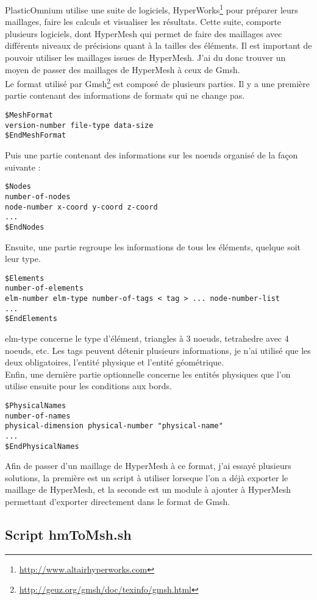 PlasticOmnium utilise une suite de logiciels, HyperWorks\footnote{\url{http://www.altairhyperworks.com}} pour préparer leurs maillages, faire les calculs et visualiser les résultats. Cette suite, comporte plusieurs logiciels, dont HyperMesh qui permet de faire des maillages avec différents niveaux de précisions quant à la tailles des éléments. Il est important de pouvoir utiliser les maillages issues de HyperMesh. J'ai du donc trouver un moyen de passer des maillages de HyperMesh à ceux de Gmsh.\\
Le format utilisé par Gmsh\footnote{\url{http://geuz.org/gmsh/doc/texinfo/gmsh.html}} est composé de plusieurs parties. Il y a une première partie contenant des informations de formats qui ne change pas.
\begin{verbatim}
$MeshFormat
version-number file-type data-size
$EndMeshFormat
\end{verbatim} 
Puis une partie contenant des informations sur les noeuds organisé de la façon suivante :
\begin{verbatim}
$Nodes
number-of-nodes
node-number x-coord y-coord z-coord
...
$EndNodes
\end{verbatim}
Ensuite, une partie regroupe les informations de tous les éléments, quelque soit leur type.
\begin{verbatim}
$Elements
number-of-elements
elm-number elm-type number-of-tags < tag > ... node-number-list
...
$EndElements
\end{verbatim}
elm-type concerne le type d'élément, triangles à 3 noeuds, tetrahedre avec 4 noeuds, etc. Les tags peuvent détenir plusieurs informations, je n'ai utilisé que les deux obligatoires, l'entité physique et l'entité géométrique.\\
Enfin, une dernière partie optionnelle concerne les entités physiques que l'on utilise ensuite pour les conditions aux bords. 
\begin{verbatim}
$PhysicalNames
number-of-names
physical-dimension physical-number "physical-name"
...
$EndPhysicalNames
\end{verbatim}

Afin de passer d'un maillage de HyperMesh à ce format, j'ai essayé plusieurs solutions, la première est un script à utiliser lorseque l'on a déjà exporter le maillage de HyperMesh, et la seconde est un module à ajouter à HyperMesh permettant d'exporter directement dans le format de Gmsh. 

\subsection{Script hmToMsh.sh}

